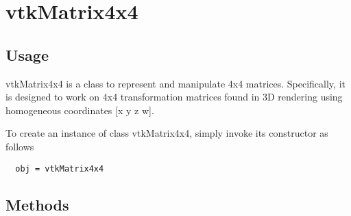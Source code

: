 \section{vtkMatrix4x4}

\subsection{Usage}

 vtkMatrix4x4 is a class to represent and manipulate 4x4 matrices. 
 Specifically, it is designed to work on 4x4 transformation matrices
 found in 3D rendering using homogeneous coordinates [x y z w].

To create an instance of class vtkMatrix4x4, simply
invoke its constructor as follows
\begin{verbatim}
  obj = vtkMatrix4x4
\end{verbatim}
\subsection{Methods}

